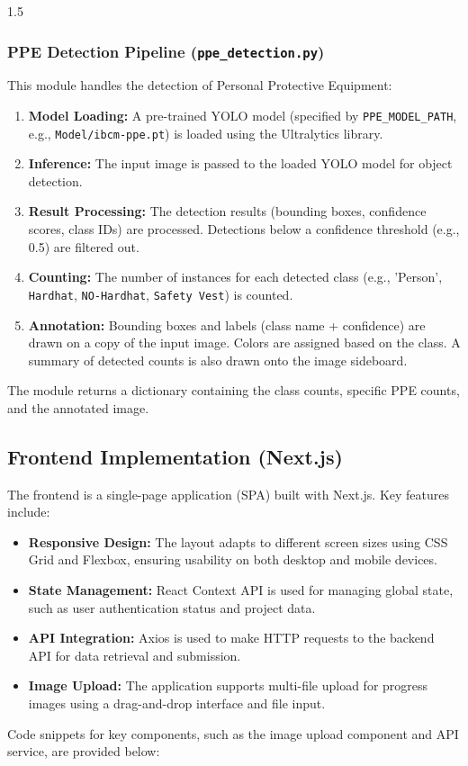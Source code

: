 \documentclass[12pt,a4paper]{report}
\begin{document}
\begin{spacing}{1.5}
    \subsubsection{PPE Detection Pipeline (\texttt{ppe\_detection.py})}
    This module handles the detection of Personal Protective Equipment:
    \begin{enumerate}
        \item \textbf{Model Loading:} A pre-trained YOLO model (specified by \texttt{PPE\_MODEL\_PATH}, e.g., \texttt{Model/ibcm-ppe.pt}) is loaded using the Ultralytics library.
        \item \textbf{Inference:} The input image is passed to the loaded YOLO model for object detection.
        \item \textbf{Result Processing:} The detection results (bounding boxes, confidence scores, class IDs) are processed. Detections below a confidence threshold (e.g., 0.5) are filtered out.
        \item \textbf{Counting:} The number of instances for each detected class (e.g., 'Person', \texttt{Hardhat}, \texttt{NO-Hardhat}, \texttt{Safety Vest}) is counted.
        \item \textbf{Annotation:} Bounding boxes and labels (class name + confidence) are drawn on a copy of the input image. Colors are assigned based on the class. A summary of detected counts is also drawn onto the image sideboard.
    \end{enumerate}
    The module returns a dictionary containing the class counts, specific PPE counts, and the annotated image.

    \subsection{Frontend Implementation (Next.js)}
    The frontend is a single-page application (SPA) built with Next.js. Key features include:
    \begin{itemize}
        \item \textbf{Responsive Design:} The layout adapts to different screen sizes using CSS Grid and Flexbox, ensuring usability on both desktop and mobile devices.
        \item \textbf{State Management:} React Context API is used for managing global state, such as user authentication status and project data.
        \item \textbf{API Integration:} Axios is used to make HTTP requests to the backend API for data retrieval and submission.
        \item \textbf{Image Upload:} The application supports multi-file upload for progress images using a drag-and-drop interface and file input.
    \end{itemize}
    Code snippets for key components, such as the image upload component and API service, are provided below:


\end{spacing}
\end{document}
